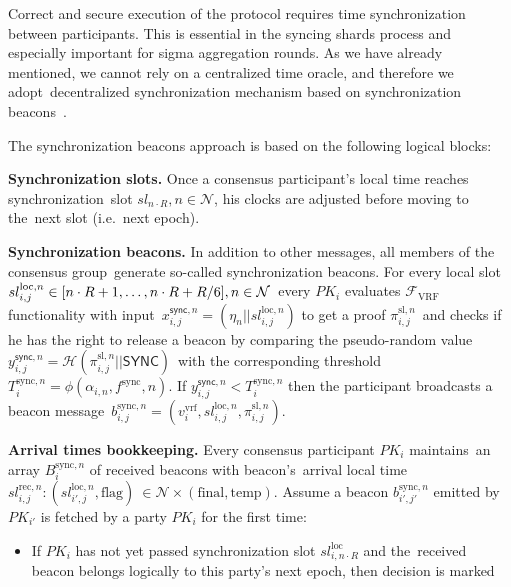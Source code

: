 Correct and secure execution of the protocol requires time synchronization between participants.
This is essential in the syncing shards process and especially important for sigma aggregation rounds.
As we have already mentioned, we cannot rely on a centralized time oracle, and therefore we adopt\
decentralized synchronization mechanism based on synchronization beacons~\cite{cryptoeprint:2019/838}.

The synchronization beacons approach is based on the following logical blocks:
\begin{legal}
    \item[]\textbf{Synchronization slots.} Once a consensus participant’s local time reaches synchronization\
    slot ${sl_{n \cdot R}, n \in \mathcal{N}}$, his clocks are adjusted before moving to the\
    next slot (i.e.\ next epoch).
    \item[]\textbf{Synchronization beacons.} In addition to other messages, all members of the consensus group\
    generate so-called synchronization beacons.
    For every local slot $sl_{i, j}^{\text{loc}, n} \in [n \cdot R + 1,\dots,n \cdot R + R \// 6], n \in \mathcal{N}$\
    every $PK_i$ evaluates $\mathcal{F}_{\text{VRF}}$ functionality with input\
    ${x_{i, j}^{\textsf{sync}, n} = (\eta_n || sl_{i, j}^{\text{loc}, n})}$ to get a proof $\pi_{i, j}^{\text{sl}, n}$\
    and checks if he has the right to release a beacon by comparing the pseudo-random value\
    ${y_{i, j}^{\textsf{sync}, n} = \mathcal{H}(\pi_{i, j}^{\text{sl}, n} || \textsf{SYNC})}$\
    with the corresponding threshold $T_{i}^{\text{sync}, n} = \phi(\alpha_{i, n}, f^{\text{sync}}, n)$.
    If ${y_{i, j}^{\textsf{sync}, n} < T_{i}^{\text{sync}, n}}$ then the participant broadcasts a beacon message\
    $b_{i, j}^{\text{sync}, n} = (v^{\text{vrf}}_i, sl_{i, j}^{\text{loc}, n}, \pi_{i, j}^{\text{sl}, n})$.
    \item[]\textbf{Arrival times bookkeeping.} Every consensus participant $PK_i$ maintains\
    an array $B_i^{\text{sync}, n}$ of received beacons with beacon's\
    arrival local time ${sl^{\text{rec}, n}_{i, j}: (sl_{i', j}^{\text{loc}, n}, \text{flag})\
    \in \mathcal{N} \times (\text{final}, \text{temp})}$.
    Assume a beacon $b_{i', j'}^{\text{sync}, n}$ emitted by $PK_{i'}$ is fetched by a party $PK_i$ for the first time:
    \begin{itemize}
        \item If $PK_i$ has not yet passed synchronization slot $sl_{i, n \cdot R}^{\text{loc}}$ and the\
        received beacon belongs logically to this party’s next epoch, then decision is marked\

\end{itemize}
\end{legal}
